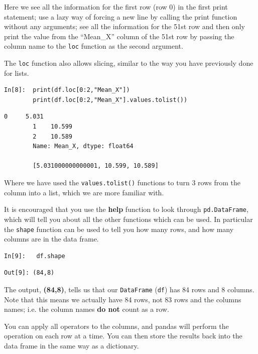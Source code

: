 \vspace{0.1cm}

Here we see all the information for the first row (row 0) in the first print statement; use a lazy way of forcing a new line by calling the print function without any arguments; see all the information for the 51st row and then only print the value from the ``Mean\_X'' column of the 51st row by passing the column name to the \texttt{loc} function as the second argument.

The \texttt{loc} function also allows slicing, similar to the way you have previously done for lists.

\begin{lstlisting}[style=PY]
In[8]:  print(df.loc[0:2,"Mean_X"])
        print(df.loc[0:2,"Mean_X"].values.tolist())
\end{lstlisting}
\begin{lstlisting}[style=PY_out]
        0     5.031
        1    10.599
        2    10.589
        Name: Mean_X, dtype: float64
        
        [5.031000000000001, 10.599, 10.589]
\end{lstlisting}

Where we have used the \texttt{values.tolist()} functions to turn 3 rows from the column into a list, which we are more familiar with.

It is encouraged that you use the \textbf{help} function to look through \texttt{pd.DataFrame}, which will tell you about all the other functions which can be used. In particular the \texttt{shape} function can be used to tell you how many rows, and how many columns are in the data frame.

\begin{lstlisting}[style=PY]
In[9]:   df.shape
\end{lstlisting}
\begin{lstlisting}[style=PY_out]
Out[9]: (84,8)
\end{lstlisting}

The output, \textbf{(84,8)}, tells us that our \texttt{DataFrame} (\texttt{df}) has 84 rows and 8 columns. Note that this means we actually have 84 rows, not 83 rows and the columns names; i.e. the column names \textbf{do not} count as a row.

You can apply all operators to the columns, and pandas will perform the operation on each row at a time. You can then store the results back into the data frame in the same way as a dictionary.

